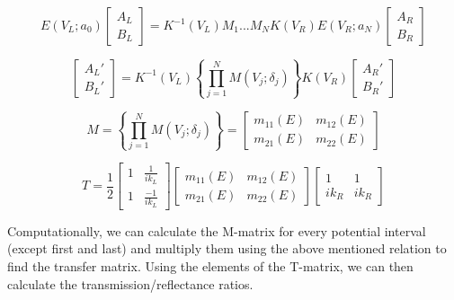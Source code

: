 \documentclass{article}
\begin{document}
\[
E(V_L; a_0)
\begin{bmatrix}
A_L \\
B_L
\end{bmatrix}
= K^{-1}(V_L)M_1...M_NK(V_R)E(V_R;a_N)
\begin{bmatrix}
A_R \\
B_R
\end{bmatrix}
\]

\[
\begin{bmatrix}
A_L'\\
B_L'
\end{bmatrix}
= K^{-1}(V_L) \left \{\prod_{j=1}^N M(V_j;\delta_j) \right \} K(V_R) 
\begin{bmatrix}
A_R' \\
B_R'
\end{bmatrix}
\]

\[
M = 
\left \{\prod_{j=1}^N M(V_j;\delta_j) \right \}
=
\begin{bmatrix}
m_11(E) & m_{12}(E) \\
m_21(E) & m_{22}(E) 
\end{bmatrix}
\]

\[ 
T = \frac{1}{2}
\begin{bmatrix}
1 & \frac{1}{ik_L} \\
1 & \frac{-1}{ik_L}
\end{bmatrix}
%
\begin{bmatrix}
m_{11}(E) & m_{12}(E) \\
m_{21}(E) & m_{22}(E) 
\end{bmatrix}
%
\begin{bmatrix}
1 & 1 \\
ik_R & ik_R
\end{bmatrix}
\]

Computationally, we can calculate the M-matrix for every potential interval (except first and last) and multiply them using the above mentioned relation to find the transfer matrix. Using the elements of the T-matrix, we can then calculate the transmission/reflectance ratios.
\newpage
\end{document}
